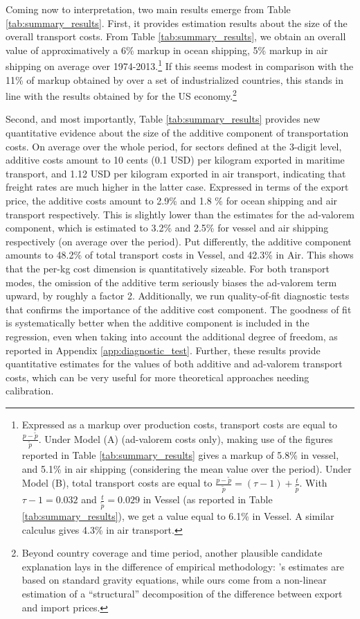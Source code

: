 \documentclass[a4paper,11pt]{article}
\begin{document}
Coming now to interpretation, two main results emerge from Table \ref{tab:summary_results}. First, it provides estimation results about the size of the overall transport costs. From Table \ref{tab:summary_results}, we obtain an overall value of approximatively a 6\% markup in ocean shipping, 5\% markup in air shipping on average over 1974-2013.\footnote{Expressed as a markup over production costs, transport costs are equal to $\frac{p-\widetilde{p}}{\widetilde{p}}$. Under Model (A) (ad-valorem costs only), making use of the figures reported in Table \ref{tab:summary_results} gives a markup of 5.8\% in vessel, and 5.1\% in air shipping (considering the mean value over the period). Under Model (B), total transport costs are equal to $\frac{p-\widetilde{p}}{\widetilde{p}} = (\tau-1) + \frac{t}{\widetilde{p}}$. With $\tau-1= 0.032$ and $\frac{t}{\widetilde{p}}= 0.029$ in Vessel (as reported in Table \ref{tab:summary_results}), we get a value equal to 6.1\% in Vessel. A similar calculus gives 4.3\% in air transport.} If this seems modest in comparison with the 11\% of markup obtained by \citet{anderson_wincoop_jel} over a set of industrialized countries, this stands in line with the results obtained by \citet{hummels2007} for the US economy.\footnote{Beyond country coverage and time period, another plausible candidate explanation lays in the difference of empirical methodology: \citet{anderson_wincoop_jel}'s estimates are based on standard gravity equations, while ours come from a non-linear estimation of a ``structural'' decomposition of the difference between export and import prices.}

Second, and most importantly, Table \ref{tab:summary_results} provides new quantitative evidence about the size of the additive component of transportation costs. On average over the whole period, for sectors defined at the 3-digit level, additive costs amount to 10 cents (0.1 USD) per kilogram exported in maritime transport, and 1.12 USD per kilogram exported in air transport, indicating that freight rates are much higher in the latter case. Expressed in terms of the export price, the additive costs amount to 2.9\% and 1.8 \% for ocean shipping and air transport respectively. This is slightly lower than the estimates for the ad-valorem component, which is estimated to 3.2\% and 2.5\% for vessel and air shipping respectively (on average over the period). Put differently, the additive component amounts to 48.2\% of total transport costs in Vessel, and 42.3\% in Air. This shows that the per-kg cost dimension is quantitatively sizeable. For both transport modes, the omission of the additive term seriously biases the ad-valorem term upward, by roughly a factor 2. Additionally, we run quality-of-fit diagnostic tests that confirms the importance of the additive cost component. The goodness of fit is systematically better when the additive component is included in the regression, even when taking into account the additional degree of freedom, as reported in Appendix \ref{app:diagnostic_test}. Further, these results provide quantitative estimates for the values of both additive and ad-valorem transport costs, which can be very useful for more theoretical approaches needing calibration.\smallskip
\end{document}
